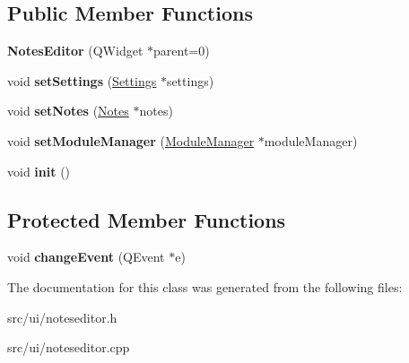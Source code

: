 \subsection*{Public Member Functions}
\begin{DoxyCompactItemize}
\item 
\hypertarget{classNotesEditor_a67fb96e8b000130a1960c57dae3317b3}{
{\bfseries NotesEditor} (QWidget $\ast$parent=0)}
\label{classNotesEditor_a67fb96e8b000130a1960c57dae3317b3}

\item 
\hypertarget{classNotesEditor_a14cb0100ff6972f18cc6fadb7b23e478}{
void {\bfseries setSettings} (\hyperlink{classSettings}{Settings} $\ast$settings)}
\label{classNotesEditor_a14cb0100ff6972f18cc6fadb7b23e478}

\item 
\hypertarget{classNotesEditor_a65b5b493ff453cf5e98100e1259df5c3}{
void {\bfseries setNotes} (\hyperlink{classNotes}{Notes} $\ast$notes)}
\label{classNotesEditor_a65b5b493ff453cf5e98100e1259df5c3}

\item 
\hypertarget{classNotesEditor_a16ecd207e5b8968c8d5e6f83eaede049}{
void {\bfseries setModuleManager} (\hyperlink{classModuleManager}{ModuleManager} $\ast$moduleManager)}
\label{classNotesEditor_a16ecd207e5b8968c8d5e6f83eaede049}

\item 
\hypertarget{classNotesEditor_a24347a669f59b5ca9ea10de256fe1853}{
void {\bfseries init} ()}
\label{classNotesEditor_a24347a669f59b5ca9ea10de256fe1853}

\end{DoxyCompactItemize}
\subsection*{Protected Member Functions}
\begin{DoxyCompactItemize}
\item 
\hypertarget{classNotesEditor_af1e5bf52f442357e0c2ce9282a4fe6ae}{
void {\bfseries changeEvent} (QEvent $\ast$e)}
\label{classNotesEditor_af1e5bf52f442357e0c2ce9282a4fe6ae}

\end{DoxyCompactItemize}


The documentation for this class was generated from the following files:\begin{DoxyCompactItemize}
\item 
src/ui/noteseditor.h\item 
src/ui/noteseditor.cpp\end{DoxyCompactItemize}
